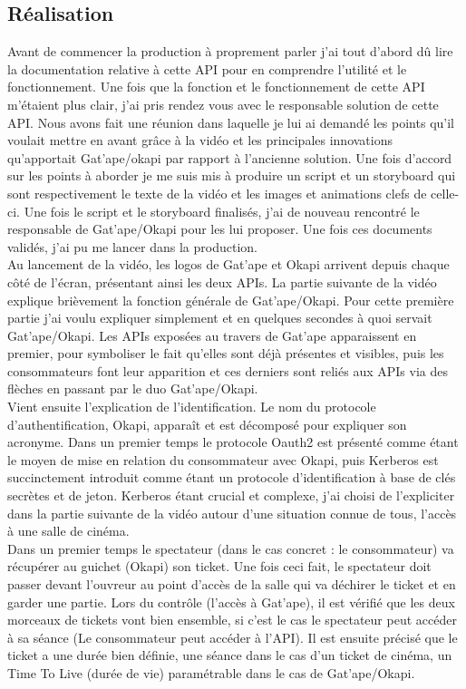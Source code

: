 \subsection{Réalisation}
Avant de commencer la production à proprement parler j'ai tout d'abord dû lire la documentation relative à cette API pour en comprendre l'utilité et le fonctionnement. Une fois que la fonction et le fonctionnement de cette API m'étaient plus clair, j'ai pris rendez vous avec le responsable solution de cette API. Nous avons fait une réunion dans laquelle je lui ai demandé les points qu'il voulait mettre en avant grâce à la vidéo et les principales innovations qu'apportait Gat'ape/okapi par rapport à l'ancienne solution. Une fois d'accord sur les points à aborder je me suis mis à produire un script et un storyboard qui sont respectivement le texte de la vidéo et les images et animations clefs de celle-ci. Une fois le script et le storyboard finalisés, j'ai de nouveau rencontré le responsable de Gat'ape/Okapi pour les lui proposer. Une fois ces documents validés, j'ai pu me lancer dans la production. \\

Au lancement de la vidéo, les logos de Gat'ape et Okapi arrivent depuis chaque côté de l'écran, présentant ainsi les deux APIs. La partie suivante de la vidéo explique brièvement la fonction générale de Gat'ape/Okapi. Pour cette première partie j'ai voulu expliquer simplement et en quelques secondes à quoi servait Gat'ape/Okapi. Les APIs exposées au travers de Gat'ape apparaissent en premier, pour symboliser le fait qu'elles sont déjà présentes et visibles, puis les consommateurs font leur apparition et ces derniers sont reliés aux APIs via des flèches en passant par le duo Gat'ape/Okapi.\\

Vient ensuite l'explication de l'identification. Le nom du protocole d'authentification, Okapi, apparaît et est décomposé pour expliquer son acronyme. Dans un premier temps le protocole Oauth2 est présenté comme étant le moyen de mise en relation du consommateur avec Okapi,  puis Kerberos est succinctement introduit comme étant un protocole d'identification à base de clés secrètes et de jeton. Kerberos étant crucial et complexe, j'ai choisi de l'expliciter dans la partie suivante de la vidéo autour d'une situation connue de tous, l'accès à une salle de cinéma.\\

Dans un premier temps le spectateur (dans le cas concret : le consommateur) va récupérer au guichet (Okapi) son ticket. Une fois ceci fait, le spectateur doit passer devant l'ouvreur au point d'accès de la salle qui va déchirer le ticket et en garder une partie. Lors du contrôle (l'accès à Gat'ape), il est vérifié que les deux morceaux de tickets vont bien ensemble, si c'est le cas le spectateur peut accéder à sa séance (Le consommateur peut accéder à l'API). Il est ensuite précisé que le ticket a une durée bien définie, une séance dans le cas d'un ticket de cinéma, un Time To Live (durée de vie) paramétrable dans le cas de Gat'ape/Okapi.\\

